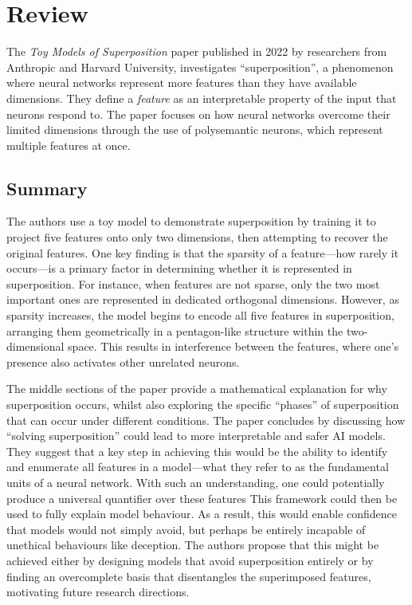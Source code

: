 \section{Review}
\label{sec:review}

The \textit{Toy Models of Superposition} paper \cite{elhage2022toymodelssuperposition} published in 2022 by researchers from Anthropic and Harvard University, investigates ``superposition'', a phenomenon where neural networks represent more features than they have available dimensions.
They define a \textit{feature} as an interpretable property of the input that neurons respond to.
The paper focuses on how neural networks overcome their limited dimensions through the use of polysemantic neurons, which represent multiple features at once.


\subsection{Summary}

The authors use a toy model to demonstrate superposition by training it to project five features onto only two dimensions, then attempting to recover the original features.
One key finding is that the sparsity of a feature—how rarely it occurs—is a primary factor in determining whether it is represented in superposition. For instance, when features are not sparse, only the two most important ones are represented in dedicated orthogonal dimensions.
However, as sparsity increases, the model begins to encode all five features in superposition, arranging them geometrically in a pentagon-like structure within the two-dimensional space.
This results in interference between the features, where one's presence also activates other unrelated neurons.

The middle sections of the paper provide a mathematical explanation for why superposition occurs, whilst also exploring the specific ``phases'' of superposition that can occur under different conditions.
The paper concludes by discussing how ``solving superposition'' could lead to more interpretable and safer AI models.
They suggest that a key step in achieving this would be the ability to identify and enumerate all features in a model—what they refer to as the fundamental units of a neural network.
With such an understanding, one could potentially produce a universal quantifier over these features
This framework could then be used to fully explain model behaviour.
As a result, this would enable confidence that models would not simply avoid, but perhaps be entirely incapable of unethical behaviours like deception.
The authors propose that this might be achieved either by designing models that avoid superposition entirely or by finding an overcomplete basis that disentangles the superimposed features, motivating future research directions.

